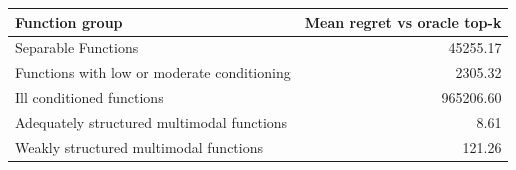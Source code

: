\begin{tabular}{lr}
\toprule
Function group & Mean regret vs oracle top-k \\
\midrule
Separable Functions & 45255.17 \\
Functions with low or moderate conditioning & 2305.32 \\
Ill conditioned functions & 965206.60 \\
Adequately structured multimodal functions & 8.61 \\
Weakly structured multimodal functions & 121.26 \\
\bottomrule
\end{tabular}
